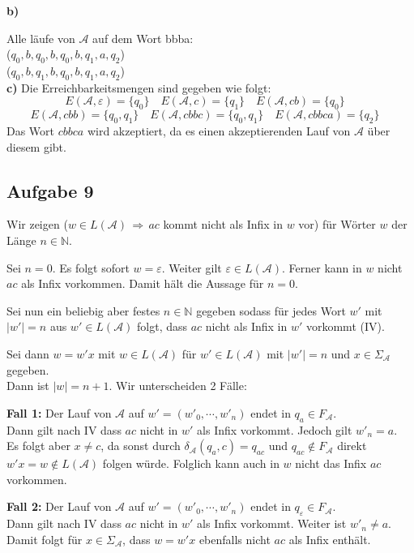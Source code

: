 \documentclass[a4paper,graphics,11pt]{article}
\newcommand{\aufgabe}[1]{\subsection*{Aufgabe #1}}
\begin{document}
\textbf{b)}

Alle läufe von $\mathcal{A}$ auf dem Wort bbba:\\
($q_0,b,q_0,b,q_0,b,q_1,a,q_2$)\\
($q_0,b,q_1,b,q_0,b,q_1,a,q_2$)\\

\textbf{c)}
Die Erreichbarkeitsmengen sind gegeben wie folgt:
$$
    E(\mathcal{A}, \varepsilon) = \{q_0\} \quad
    E(\mathcal{A}, c) = \{q_1\} \quad
    E(\mathcal{A}, cb) = \{q_0\} \quad
$$$$
    E(\mathcal{A}, cbb) = \{q_0, q_1\} \quad
    E(\mathcal{A}, cbbc) = \{q_0, q_1\} \quad
    E(\mathcal{A}, cbbca) = \{q_2\} \quad
$$
Das Wort $cbbca$ wird akzeptiert, da es einen akzeptierenden Lauf von $\mathcal{A}$ über diesem gibt.

\newpage
\aufgabe{9}
Wir zeigen ($w \in L(\mathcal{A}) \,\Longrightarrow\, ac$ kommt nicht als Infix in $w$ vor) für Wörter $w$ der Länge
$n \in \mathbb{N}$.

Sei $n = 0$. Es folgt sofort $w = \varepsilon$. Weiter gilt $\varepsilon \in L(\mathcal{A})$. Ferner kann in $w$ nicht $ac$ als Infix vorkommen.
Damit hält die Aussage für $n = 0$.

Sei nun ein beliebig aber festes $n \in \mathbb{N}$ gegeben sodass
für jedes Wort $w'$ mit $|w'| = n$ aus $w' \in L(\mathcal{A})$ folgt, dass $ac$ nicht als Infix in $w'$ vorkommt (IV).

Sei dann $w = w'x$ mit $w \in L(\mathcal{A})$ für $w' \in L(\mathcal{A})$ mit $|w'| = n$ und $x \in \Sigma_\mathcal{A}$ gegeben.\\
Dann ist $|w| = n+1$. Wir unterscheiden 2 Fälle:

\textbf{Fall 1:} Der Lauf von $\mathcal{A}$ auf $w' = (w'_0, \cdots, w'_n)$ endet in $q_a \in F_{\mathcal{A}}$.\\
Dann gilt nach IV dass $ac$ nicht in $w'$ als Infix vorkommt. Jedoch gilt $w'_n = a$. \\
Es folgt aber $x \neq c$, da sonst durch $\delta_\mathcal{A}(q_a, c) = q_{ac}$ und $q_{ac} \notin F_{\mathcal{A}}$ direkt $w'x = w \notin L(\mathcal{A})$ folgen würde. Folglich kann auch in $w$ nicht das Infix $ac$ vorkommen.

\textbf{Fall 2:} Der Lauf von $\mathcal{A}$ auf $w' = (w'_0, \cdots, w'_n)$ endet in $q_{\varepsilon} \in F_{\mathcal{A}}$.\\
Dann gilt nach IV dass $ac$ nicht in $w'$ als Infix vorkommt. Weiter ist $w'_n \neq a$. Damit folgt
für $x \in \Sigma_\mathcal{A}$, dass $w = w'x$ ebenfalls nicht $ac$ als Infix enthält.
\end{document}
